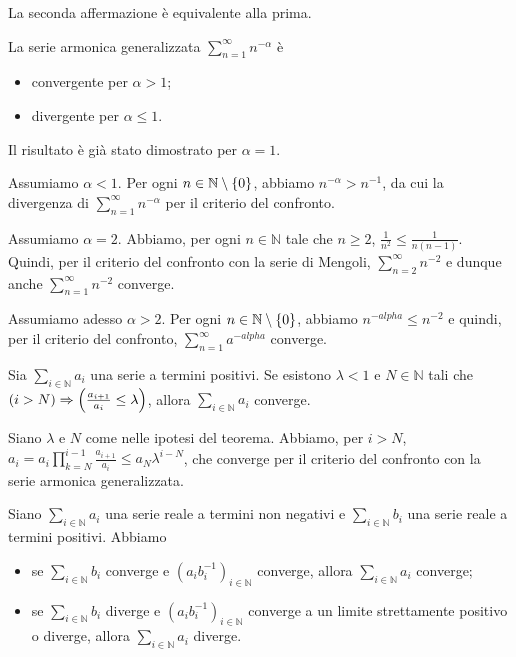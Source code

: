 \par La seconda affermazione \`e equivalente alla prima. \EndProof
\begin{Theorem}
	La serie armonica generalizzata $\sum_{n = 1}^\infty n^{-\alpha}$ \`e
	\begin{itemize}
		\item convergente per $\alpha > 1$;
		\item divergente per $\alpha \leq 1$.
	\end{itemize}
\end{Theorem}
\Proof Il risultato \`e gi\`a stato dimostrato per $\alpha = 1$.
\par Assumiamo $\alpha < 1$. Per ogni $n \in \mathbb{N} \setminus \lbrace 0 \rbrace$, abbiamo $n^{-\alpha} > n^{-1}$, da cui la divergenza di $\sum_{n = 1}^\infty n^{-\alpha}$ per il criterio del confronto.
\par Assumiamo $\alpha = 2$. Abbiamo, per ogni $n \in \mathbb{N}$ tale che $n \geq 2$, $\frac{1}{n^2} \leq \frac{1}{n(n - 1)}$. Quindi, per il criterio del confronto con la serie di Mengoli, $\sum_{n = 2}^\infty n^{-2}$ e dunque anche $\sum_{n = 1}^\infty n^{-2}$ converge.
\par Assumiamo adesso $\alpha > 2$. Per ogni $n \in \mathbb{N} \setminus \lbrace 0 \rbrace$, abbiamo $n^{- alpha} \leq n^{- 2}$ e quindi, per il criterio del confronto, $\sum_{n = 1}^\infty a^{-alpha}$ converge.
\begin{Theorem}
	 Sia $\sum_{i \in \mathbb{N}} a_i$ una serie a termini positivi. Se esistono $\lambda < 1$ e $N \in \mathbb{N}$ tali che $\left ( i > N \right ) \Rightarrow \left ( \frac{a_{i + 1}}{a_i} \leq \lambda \right )$, allora $\sum_{i \in \mathbb{N}} a_i$ converge.
\end{Theorem}
\Proof Siano $\lambda$ e $N$ come nelle ipotesi del teorema. Abbiamo, per $i > N$, $a_i = a_i \prod_{k = N}^{i - 1}\frac{a_{i + 1}}{a_i} \leq a_N \lambda^{i - N}$, che converge per il criterio del confronto con la serie armonica generalizzata. \EndProof
\begin{Theorem}
	 Siano $\sum_{i \in \mathbb{N}} a_i$ una serie reale a termini non negativi e $\sum_{i \in \mathbb{N}} b_i$ una serie reale a termini positivi. Abbiamo
	\begin{itemize}
		\item se $\sum_{i \in \mathbb{N}} b_i$ converge e $(a_ib_i^{-1})_{i \in \mathbb{N}}$ converge, allora $\sum_{i \in \mathbb{N}} a_i$ converge;
		\item se $\sum_{i \in \mathbb{N}} b_i$ diverge e $(a_ib_i^{-1})_{i \in \mathbb{N}}$ converge a un limite strettamente positivo o diverge, allora $\sum_{i \in \mathbb{N}} a_i$ diverge.
	\end{itemize}
\end{Theorem}
